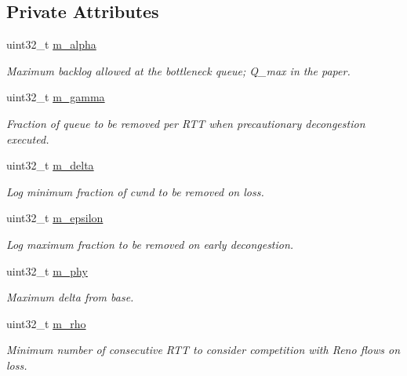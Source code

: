 \subsection*{Private Attributes}
\begin{DoxyCompactItemize}
\item 
uint32\+\_\+t \hyperlink{classns3_1_1TcpYeah_aa61ce240a53170a18b44144abe864def}{m\+\_\+alpha}
\begin{DoxyCompactList}\small\item\em Maximum backlog allowed at the bottleneck queue; Q\+\_\+max in the paper. \end{DoxyCompactList}\item 
uint32\+\_\+t \hyperlink{classns3_1_1TcpYeah_ae9bf0e2021209e59fe5fddd2afff6c22}{m\+\_\+gamma}
\begin{DoxyCompactList}\small\item\em Fraction of queue to be removed per R\+TT when precautionary decongestion executed. \end{DoxyCompactList}\item 
uint32\+\_\+t \hyperlink{classns3_1_1TcpYeah_af36b0f4c1017a437469d909a22650f84}{m\+\_\+delta}
\begin{DoxyCompactList}\small\item\em Log minimum fraction of cwnd to be removed on loss. \end{DoxyCompactList}\item 
uint32\+\_\+t \hyperlink{classns3_1_1TcpYeah_acd0da743a9c773afb1f4e295bc95b22c}{m\+\_\+epsilon}
\begin{DoxyCompactList}\small\item\em Log maximum fraction to be removed on early decongestion. \end{DoxyCompactList}\item 
uint32\+\_\+t \hyperlink{classns3_1_1TcpYeah_abcb83c9c36e0dbc75a19c4af8e08f8ad}{m\+\_\+phy}
\begin{DoxyCompactList}\small\item\em Maximum delta from base. \end{DoxyCompactList}\item 
uint32\+\_\+t \hyperlink{classns3_1_1TcpYeah_ada328f61ed71f07744835de4bf78927c}{m\+\_\+rho}
\begin{DoxyCompactList}\small\item\em Minimum number of consecutive R\+TT to consider competition with Reno flows on loss. \end{DoxyCompactList}\item 

\end{DoxyCompactItemize}
